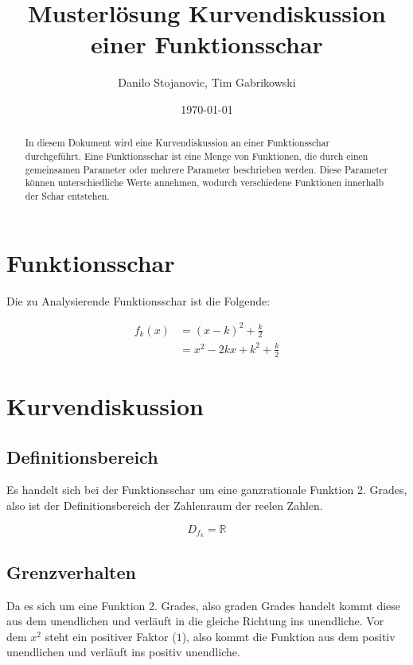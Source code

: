 \documentclass[12pt,a4paper]{article}
\title{Musterlösung Kurvendiskussion einer Funktionsschar}
\author{Danilo Stojanovic, Tim Gabrikowski}
\date{\today}
\begin{document}
\maketitle

\begin{abstract}
In diesem Dokument wird eine Kurvendiskussion an einer Funktionsschar durchgeführt. Eine Funktionsschar ist eine Menge von Funktionen, die durch einen gemeinsamen Parameter oder mehrere Parameter beschrieben werden. Diese Parameter können unterschiedliche Werte annehmen, wodurch verschiedene Funktionen innerhalb der Schar entstehen.
\end{abstract}

\newpage

\section{Funktionsschar}

Die zu Analysierende Funktionsschar ist die Folgende:

\begin{equation}
    \label{eq:function}
    \begin{aligned}
        f_k(x)&=(x-k)^2+\frac{k}{2} \\ 
        &= x^2 - 2kx + k^2 + \frac{k}{2}
    \end{aligned}
\end{equation}

\section{Kurvendiskussion}

\subsection{Definitionsbereich}

Es handelt sich bei der Funktionsschar um eine ganzrationale Funktion 2. Grades, also ist der Definitionsbereich der Zahlenraum der reelen Zahlen.

\begin{equation}
    \label{eq:defB}
    D_{f_k} = \mathbb{R}
\end{equation}

\subsection{Grenzverhalten}

Da es sich um eine Funktion 2. Grades, also graden Grades handelt kommt diese aus dem unendlichen und verläuft in die gleiche Richtung ins unendliche. Vor dem $x^2$ steht ein positiver Faktor ($1$), also kommt die Funktion aus dem positiv unendlichen und verläuft ins positiv unendliche.
\end{document}
